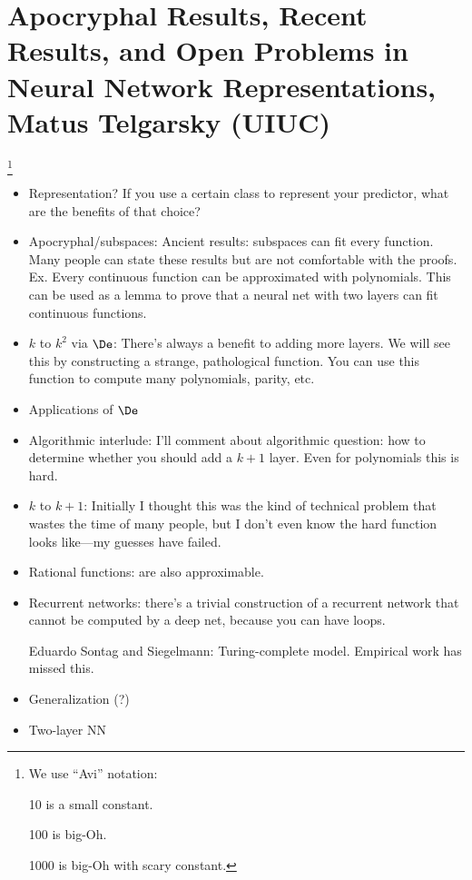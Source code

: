 \section{Apocryphal Results, Recent Results, and Open Problems in Neural Network Representations, Matus Telgarsky (UIUC)}
\footnote{We use ``Avi'' notation: 

10 is a small constant.

100 is big-Oh.

1000 is big-Oh with scary constant.
}

\begin{itemize}
\item
Representation? If you use a certain class to represent your predictor, what are the benefits of that choice?
\item
Apocryphal/subspaces: Ancient results: subspaces can fit every function. Many people can state these results but are not comfortable with the proofs. Ex. Every continuous function can be approximated with polynomials. This can be used as a lemma to prove that a neural net with two layers can fit continuous functions.
\item
$k$ to $k^2$ via $\De$: There's always a benefit to adding more layers. We will see this by constructing a strange, pathological function. You can use this function to compute many polynomials, parity, etc.
\item
Applications of $\De$
\item
Algorithmic interlude: I'll comment about algorithmic question: how to determine whether you should add a $k+1$ layer. Even for polynomials this is hard.
\item
$k$ to $k+1$: Initially I thought this was the kind of technical problem that wastes the time of many people, but I don't even know the hard function looks like---my guesses have failed.
\item
Rational functions: are also approximable.
\item
Recurrent networks: there's a trivial construction of a recurrent network that cannot be computed by a deep net, because you can have loops.

Eduardo Sontag and Siegelmann: Turing-complete model. Empirical work has missed this. 
\item
Generalization (?)
\item Two-layer NN
\end{itemize}

